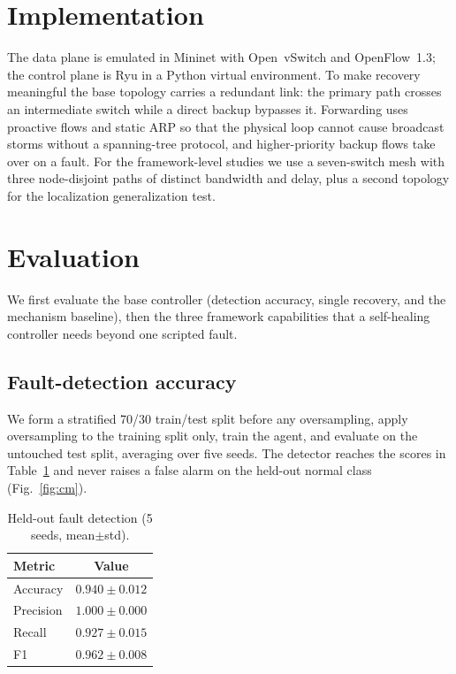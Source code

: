 \documentclass[conference]{IEEEtran}
\begin{document}
\section{Implementation}
The data plane is emulated in Mininet with Open~vSwitch and OpenFlow~1.3; the control
plane is Ryu in a Python virtual environment. To make recovery meaningful the base
topology carries a redundant link: the primary path crosses an intermediate switch
while a direct backup bypasses it. Forwarding uses proactive flows and static ARP so
that the physical loop cannot cause broadcast storms without a spanning-tree
protocol, and higher-priority backup flows take over on a fault. For the
framework-level studies we use a seven-switch mesh with three node-disjoint paths of
distinct bandwidth and delay, plus a second topology for the localization
generalization test.

\section{Evaluation}
\label{sec:eval}
We first evaluate the base controller (detection accuracy, single recovery, and the
mechanism baseline), then the three framework capabilities that a self-healing
controller needs beyond one scripted fault.

\subsection{Fault-detection accuracy}
\label{sec:detect-acc}
We form a stratified 70/30 train/test split before any oversampling, apply
oversampling to the training split only, train the agent, and evaluate on the
untouched test split, averaging over five seeds. The detector reaches the scores in
Table~\ref{tab:detect} and never raises a false alarm on the held-out normal class
(Fig.~\ref{fig:cm}).

\begin{table}[t]
\caption{Held-out fault detection (5 seeds, mean$\pm$std).}
\label{tab:detect}
\centering
\begin{tabular}{lc}
\toprule
Metric & Value \\
\midrule
Accuracy  & $0.940 \pm 0.012$ \\
Precision & $1.000 \pm 0.000$ \\
Recall    & $0.927 \pm 0.015$ \\
F1        & $0.962 \pm 0.008$ \\
\bottomrule
\end{tabular}
\end{table}
\end{document}
